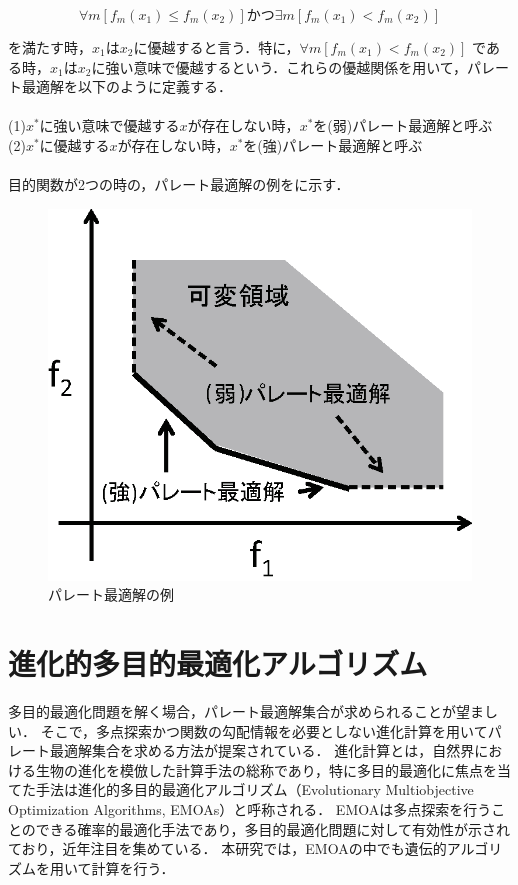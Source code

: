 \documentclass[../main/main]{subfiles}
\begin{document}
\begin{equation} 
\left.
\forall m[f_m(x_1) \leq f_m(x_2)] かつ \exists m[f_m(x_1) < f_m(x_2)]
\label{yuuetu}
\right.
\end{equation}

を満たす時，$x_1$は$x_2$に優越すると言う．特に，$\forall m[f_m(x_1) < f_m(x_2)]$ である時，$x_1$は$x_2$に強い意味で優越するという．これらの優越関係を用いて，パレート最適解を以下のように定義する．\\
\\
(1)$x^*$に強い意味で優越する$x$が存在しない時，$x^*$を(弱)パレート最適解と呼ぶ\\
(2)$x^*$に優越する$x$が存在しない時，$x^*$を(強)パレート最適解と呼ぶ\\
\\
目的関数が2つの時の，パレート最適解の例をに示す．

\begin{figure}[htbp]
\begin{center}
\includegraphics[width=0.5\linewidth]{../figures/pareto.eps}
\end{center}
\caption{パレート最適解の例}
\label{pareto_opt}
\end{figure}

\section{進化的多目的最適化アルゴリズム}
\quad 多目的最適化問題を解く場合，パレート最適解集合が求められることが望ましい．
そこで，多点探索かつ関数の勾配情報を必要としない進化計算を用いてパレート最適解集合を求める方法が提案されている．
進化計算とは，自然界における生物の進化を模倣した計算手法の総称であり，特に多目的最適化に焦点を当てた手法は進化的多目的最適化アルゴリズム（Evolutionary Multiobjective Optimization Algorithms, EMOAs）と呼称される．
EMOAは多点探索を行うことのできる確率的最適化手法であり，多目的最適化問題に対して有効性が示されており，近年注目を集めている．
本研究では，EMOAの中でも遺伝的アルゴリズムを用いて計算を行う．
\end{document}
